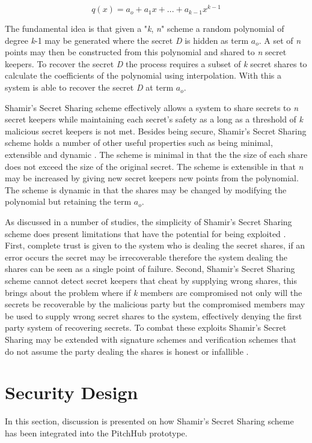 \[q(x) = a_o +a_1x + ... + a_{k-1}x^{k-1} \]

The fundamental idea is that given a "\textit{k}, \textit{n}" scheme a random polynomial of degree \textit{k}-1 may be generated where the secret \textit{D} is hidden as term \(a_o\). A set of \textit{n} points may then be constructed from this polynomial and shared to \textit{n} secret keepers. To recover the secret \textit{D} the process requires a subset of \textit{k} secret shares to calculate the coefficients of the polynomial using interpolation. With this a system is able to recover the secret \textit{D} at term \(a_o\).
\par
Shamir's Secret Sharing scheme effectively allows a system to share secrets to \textit{n} secret keepers while maintaining each secret's safety as a long as a threshold of \textit{k} malicious secret keepers is not met. Besides being secure, Shamir's Secret Sharing scheme holds a number of other useful properties such as being minimal, extensible and dynamic \cite{shamir1979share}. The scheme is minimal in that the the size of each share does not exceed the size of the original secret. The scheme is extensible in that \textit{n} may be increased by giving new secret keepers new points from the polynomial. The scheme is dynamic in that the shares may be changed by modifying the polynomial but retaining the term \(a_o\).
\par
As discussed in a number of studies, the simplicity of Shamir's Secret Sharing scheme does present limitations that have the potential for being exploited \cite{abdallah2015analysis}\cite{dautrich2012security}. First, complete trust is given to the system who is dealing the secret shares, if an error occurs the secret may be irrecoverable therefore the system dealing the shares can be seen as a single point of failure. Second, Shamir's Secret Sharing scheme cannot detect secret keepers that cheat by supplying wrong shares, this brings about the problem where if \textit{k} members are compromised not only will the secrets be recoverable by the malicious party but the compromised members may be used to supply wrong secret shares to the system, effectively denying the first party system of recovering secrets. To combat these exploits Shamir's Secret Sharing may be extended with signature schemes \cite{shoup2000practical}\cite{abdalla2001forward} and verification schemes that do not assume the party dealing the shares is honest or infallible \cite{herzberg1995proactive}\cite{cachin2002asynchronous}.

\section{Security Design}
In this section, discussion is presented on how Shamir's Secret Sharing scheme has been integrated into the PitchHub prototype.

